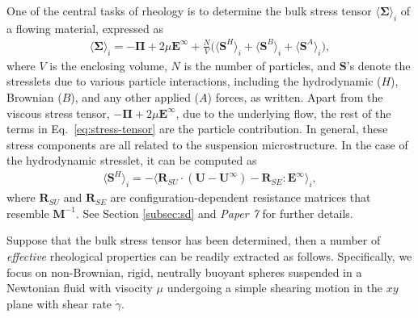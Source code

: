 One of the central tasks of rheology is to determine the bulk stress tensor $\langle \bm{\Sigma} \rangle_i$ of a flowing material, expressed as \citep{batchelor_1970, batchelor_1977}
\begin{equation} \label{eq:stress-tensor}
  \begin{aligned}
    \langle \bm{\Sigma} \rangle_i = -\bm{\Pi} +2\mu \bm{E}^\infty + \frac{N}{V} 
    \bigg(\langle \bm{S}^H \rangle_i + \langle \bm{S}^B \rangle_i +\langle \bm{S}^A \rangle_i \bigg), 
  \end{aligned}
\end{equation} 
where $V$ is the enclosing volume,
$N$ is the number of particles,
and $\bm{S}$'s denote the stresslets due to various particle interactions, including the hydrodynamic ($H$), Brownian ($B$), and any other applied ($A$) forces, as written.
Apart from the viscous stress tensor, $-\bm{\Pi} +2\mu \bm{E}^\infty$, due to the underlying flow, the rest of the terms in Eq.\ \eqref{eq:stress-tensor} are the particle contribution.
In general, these stress components are all related to the suspension microstructure.
In the case of the hydrodynamic stresslet, it can be computed as
\begin{equation} 
  \begin{aligned}
    \langle \bm{S}^H \rangle_i = - \langle \bm{R}_{SU}\cdot(\bm{U}-\bm{U}^\infty) - \bm{R}_{SE}:\bm{E}^\infty \rangle_i , 
  \end{aligned}
\end{equation}
where $\bm{R}_{SU}$ and $\bm{R}_{SE}$ are configuration-dependent resistance matrices that resemble $\bm{M}^{-1}$.
See Section \ref{subsec:sd} and \emph{Paper 7} for further details.

\bigskip
Suppose that the bulk stress tensor has been determined, then a number of \emph{effective} rheological properties can be readily extracted as follows.
Specifically, we focus on non-Brownian, rigid, neutrally buoyant spheres suspended in a Newtonian fluid with visocity $\mu$ undergoing a simple shearing motion in the $xy$ plane with shear rate $\dot{\gamma}$.

